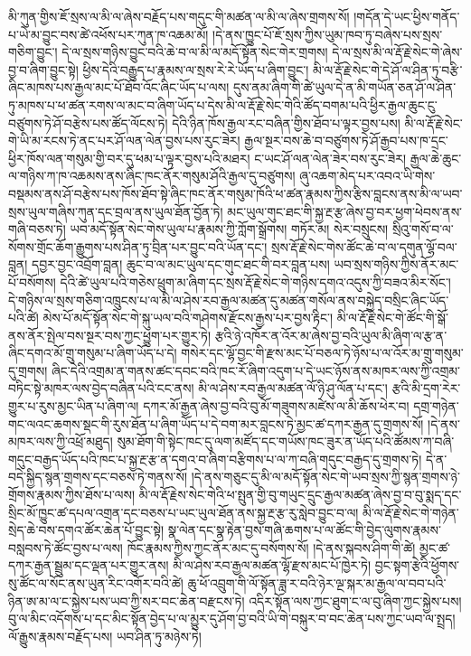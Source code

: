 \documentclass{article}
\begin{document}
མི་ཀུན་གྱིས་ཇོ་སྲས་ལ་མི་ལ་ཞེས་བརྗོད་པས་གདུང་གི་མཚན་ལ་མི་ལ་ཞེས་གྲགས་སོ། །གདོན་དེ་ཡང་ཕྱིས་གནོད་པ་ཡེ་མ་བྱུང་བས་ཚེ་འཕོས་པར་ཀུན་ཁ་འཆམ་མོ། །དེ་ནས་ཁྱུང་པོ་ཇོ་སྲས་ཀྱིས་ཡུམ་ཁབ་ཏུ་བཞེས་པས་སྲས་གཅིག་བྱུང་། དེ་ལ་སྲས་གཉིས་བྱུང་བའི་ཆེ་བ་ལ་མི་ལ་མདོ་སྟོན་སེང་གེར་གྲགས། དེ་ལ་སྲས་མི་ལ་རྡོ་རྗེ་སེང་གེ་ཞེས་བྱ་བ་ཞིག་བྱུང་སྟེ། ཕྱིས་དེའི་བརྒྱུད་པ་རྣམས་ལ་སྲས་རེ་རེ་ཡོད་པ་ཞིག་བྱུང་། མི་ལ་རྡོ་རྗེ་སེང་གེ་དེ་ཤོ་ལ་ཤིན་ཏུ་བརྩི་ཞིང་མཁས་པས་རྒྱལ་མང་པོ་ཐོབ་འོང་ཞིང་ཡོད་པ་ལས། དུས་ནམ་ཞིག་གི་ཚེ་ཡུལ་དེ་ན་མི་གཡོན་ཅན་ཤོ་ལ་ཤིན་ཏུ་མཁས་པ་ཕ་ཚན་རགས་ལ་མང་བ་ཞིག་ཡོད་པ་དེས་མི་ལ་རྡོ་རྗེ་སེང་གེའི་ཚོད་བགམ་པའི་ཕྱིར་རྒྱལ་ཆུང་ངུ་བཙུགས་ཏེ་ཤོ་བརྩེས་པས་ཚོད་ལོངས་ཏེ། དེའི་ཉིན་ཁོས་རྒྱལ་རང་བཞིན་གྱིས་ཐོབ་པ་ལྟར་བྱས་པས། མི་ལ་རྡོ་རྗེ་སེང་གེ་ཡི་མ་རངས་ཏེ་ནང་པར་ཤོ་ལན་ལེན་བྱས་པས་རུང་ཟེར། རྒྱལ་སྔར་བས་ཆེ་བ་བཙུགས་ཏེ་ཤོ་རྒྱབ་པས་ཁ་དྲང་ཕྱིར་ཁོས་ལན་གསུམ་གྱི་བར་དུ་ཕམ་པ་ལྟར་བྱས་པའི་མཐར། ང་ཡང་ཤོ་ལན་ལེན་ཟེར་བས་རུང་ཟེར། རྒྱལ་ཆེ་ཆུང་ལ་གཉིས་ཀ་ཁ་འཆམས་ནས་ཞིང་ཁང་ནོར་གསུམ་ཤོའི་རྒྱལ་དུ་བཙུགས། ཞུ་འཆག་མེད་པར་འབའ་ཡི་གེས་བསྡམས་ནས་ཤོ་བརྩེས་པས་ཁོས་ཐོབ་སྟེ་ཞིང་ཁང་ནོར་གསུམ་ཁོའི་ཕ་ཚན་རྣམས་ཀྱིས་རྩིས་བླངས་ནས་མི་ལ་ཡབ་སྲས་ཡུལ་གཞིས་ཀུན་དང་བྲལ་ནས་ཡུལ་ཐོན་བྱོན་ཏེ། མང་ཡུལ་གུང་ཐང་གི་སྐྱ་རྔ་རྩ་ཞེས་བྱ་བར་ཕྱག་ཕེབས་ནས་གཞི་བཅས་ཏེ། ཡབ་མདོ་སྟོན་སེང་གེས་ཡུལ་པ་རྣམས་ཀྱི་ཀློག་སྒྲོགས། གཏོར་མ། སེར་བསྲུངས། སྲིའུ་གསོ་བ་ལ་སོགས་གྲོང་ཆོག་རྒྱུགས་པས་ཤིན་ཏུ་བྲིན་པར་བྱུང་བའི་ཡོན་དང་། སྲས་རྡོ་རྗེ་སེང་གེས་ཚོང་ཆེ་བ་ལ་དགུན་ལྷོ་བལ་བླན། དབྱར་བྱང་འབྲོག་བླན། ཆུང་བ་ལ་མང་ཡུལ་དང་གུང་ཐང་གི་བར་བླན་པས། ཡབ་སྲས་གཉིས་ཀྱིས་ནོར་མང་པོ་བསོགས། དེའི་ཚེ་ཡུལ་པའི་གཅེས་ཕྲུག་མ་ཞིག་དང་སྲས་རྡོ་རྗེ་སེང་གེ་གཉིས་དགའ་འདུས་ཀྱི་བཟའ་མིར་སོང་། དེ་གཉིས་ལ་སྲས་གཅིག་འཁྲུངས་པ་ལ་མི་ལ་ཤེས་རབ་རྒྱལ་མཚན་དུ་མཚན་གསོལ་ནས་བསྐྱེད་བསྲིང་ཞིང་ཡོད་པའི་ཚེ། མེས་པོ་མདོ་སྟོན་སེང་གེ་སྐུ་ཡལ་བའི་གཤེགས་རྫོངས་རྒྱས་པར་བྱས་རྟིང་། མི་ལ་རྡོ་རྗེ་སེང་གེ་ཚོང་གི་སྒོ་ནས་ནོར་སྤེལ་བས་སྔར་བས་ཀྱང་ཕྱུག་པར་གྱུར་ཏེ། རྩའི་ཉེ་འཁོར་ན་འོར་མ་ཞེས་བྱ་བའི་ཡུལ་མི་ཞིག་ལ་རྩ་ན་ཞིང་དགའ་མོ་གྲུ་གསུམ་པ་ཞིག་ཡོད་པ་དེ། གསེར་དང་ལྷོ་བྱང་གི་རྫས་མང་པོ་བཅལ་ཏེ་ཉོས་པ་ལ་འོར་མ་གྲུ་གསུམ་དུ་གྲགས། ཞིང་དེའི་འགྲམ་ན་གནས་ཚང་དབང་བའི་ཁང་རོ་ཞིག་འདུག་པ་དེ་ཡང་ཉོས་ནས་མཁར་ལས་ཀྱི་འགྲམ་བཏིང་སྟེ་མཁར་ལས་བྱེད་བཞིན་པའི་ངང་ནས། མི་ལ་ཤེས་རབ་རྒྱལ་མཚན་ལོ་ཉི་ཤུ་ལོན་པ་དང་། རྩའི་མི་དྲག་རེར་གྱུར་པ་རུས་མྱང་ཡིན་པ་ཞིག་ལ། དཀར་མོ་རྒྱན་ཞེས་བྱ་བའི་བུ་མོ་གཟུགས་མཛེས་ལ་མི་ཆོས་ཕེར་བ། དགྲ་གཉེན་གང་ལའང་ཆགས་སྡང་གི་རུས་ཐོན་པ་ཞིག་ཡོད་པ་དེ་བག་མར་བླངས་ཏེ་མྱང་ཚ་དཀར་རྒྱན་དུ་གྲགས་སོ། །དེ་ནས་མཁར་ལས་ཀྱི་འཕྲོ་མཐུད། སུམ་ཐོག་གི་སྟེང་ཁང་དུ་ལག་མཛོད་དང་གཡོས་ཁང་ཟུར་ན་ཡོད་པའི་ཚོམས་ཀ་བཞི་གདུང་བརྒྱད་ཡོད་པའི་ཁང་པ་སྐྱ་རྔ་རྩ་ན་དགའ་བ་ཞིག་བརྩིགས་པ་ལ་ཀ་བཞི་གདུང་བརྒྱད་དུ་གྲགས་ཏེ། དེ་ན་བདེ་སྐྱིད་སྙན་གྲགས་དང་བཅས་ཏེ་གནས་སོ། །དེ་ནས་གཅུང་དུ་མི་ལ་མདོ་སྟོན་སེང་གེ་ཡབ་སྲས་ཀྱི་སྙན་གྲགས་ཉེ་གྲོགས་རྣམས་ཀྱིས་ཐོས་པ་ལས། མི་ལ་རྡོ་རྗེས་སེང་གེའི་ཕ་སྤུན་གྱི་བུ་གཡུང་དྲུང་རྒྱལ་མཚན་ཞེས་བྱ་བ་བུ་སྨད་དང་སྲིང་མོ་ཁྱུང་ཚ་དཔལ་འགྲན་དང་བཅས་པ་ཡང་ཡུལ་ཐོན་ནས་སྐྱ་རྔ་རྩ་རུ་སླེབ་བྱུང་བ་ལ། མི་ལ་རྡོ་རྗེ་སེང་གེ་གཉེན་སྲེད་ཆེ་བས་དགའ་ཚོར་ཆེན་པོ་བྱུང་སྟེ། སྣ་ལེན་དང་སྣ་རྟེན་བྱས་གཞི་ཆགས་པ་ལ་ཚོང་གི་བྱེད་ལུགས་རྣམས་བསླབས་ཏེ་ཚོང་བྱས་པ་ལས། ཁོང་རྣམས་ཀྱིས་ཀྱང་ནོར་མང་དུ་བསོགས་སོ། །དེ་ནས་སྐབས་ཤིག་གི་ཚེ། མྱང་ཚ་དཀར་རྒྱན་སྦྲུམ་དང་ལྡན་པར་གྱུར་ནས། མི་ལ་ཤེས་རབ་རྒྱལ་མཚན་ལྷོ་རྫས་མང་པོ་ཁྱེར་ཏེ། བྱང་སྟག་རྩེའི་ཕྱོགས་སུ་ཚོང་ལ་སོང་ནས་ཡུན་རིང་འགོར་བའི་ཚེ། ཆུ་ཕོ་འབྲུག་གི་ལོ་སྟོན་ཟླ་ར་བའི་ཉེར་ལྔ་སྐར་མ་རྒྱལ་ལ་བབ་པའི་ཉིན་ཨ་མ་ལ་ང་སྐྱེས་པས་ཡབ་ཀྱི་སར་བང་ཆེན་བརྫངས་ཏེ། འདིར་སྟོན་ལས་ཀྱང་ཐུག་ང་ལ་བུ་ཞིག་ཀྱང་སྐྱེས་པས། བུ་ལ་མིང་འདོགས་པ་དང་མིང་སྟོན་བྱེད་པ་ལ་མྱུར་དུ་ཤོག་བྱ་བའི་ཡི་གེ་བསྐུར་བ་བང་ཆེན་པས་ཀྱང་ཡབ་ལ་སྤྲད། ལོ་རྒྱུས་རྣམས་བརྗོད་པས། ཡབ་ཤིན་ཏུ་མཉེས་ཏེ། 
\end{document}
